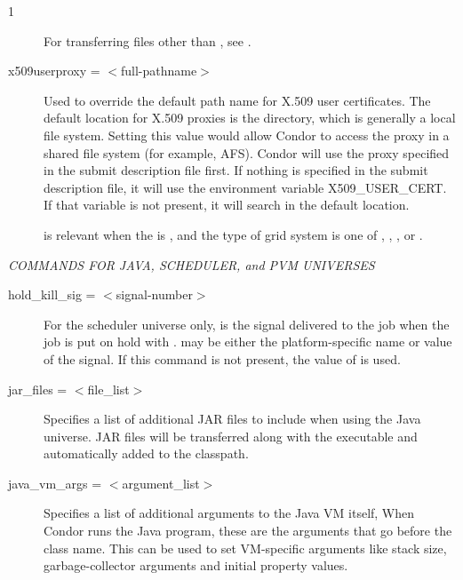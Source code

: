 \begin{ManPage}{\label{man-condor-submit}}{1}
\begin{description}
For transferring files other than ,
see .


\item[x509userproxy = $<$full-pathname$>$] Used to override the default
path name for X.509 user certificates. The default location for X.509 proxies
is the  directory,
which is generally a local file system.
Setting
this value would allow Condor to access the proxy in a shared file system
(for example, AFS).
Condor will use the proxy specified in the submit description file first.
If nothing is specified in the submit description file,
it will use the environment variable X509\_USER\_CERT.
If that variable is not present,
it will search in the default location.

 is relevant when
the  is ,
and the type of grid system is one of , ,
, or .

\end{description} 


\emph{COMMANDS FOR JAVA, SCHEDULER, and PVM UNIVERSES}
\begin{description} 


\item[hold\_kill\_sig = $<$signal-number$>$] For the scheduler universe only,
 is the signal delivered
to the job when the job is put on hold
with .
 may be either the platform-specific name or value
of the signal.
If this command is not present,
the value of  is used.



\item[jar\_files = $<$file\_list$>$]
Specifies a list of additional JAR files to include when using
the Java universe.  JAR files will be transferred along with
the executable and automatically added to the classpath.


\item[java\_vm\_args = $<$argument\_list$>$]
Specifies a list of additional arguments to the Java VM itself,
When Condor runs the Java program, these are the arguments that 
go before the class name.  This can be used to set VM-specific 
arguments like stack size, garbage-collector arguments 
and initial property values.


\end{description}
\end{ManPage}
